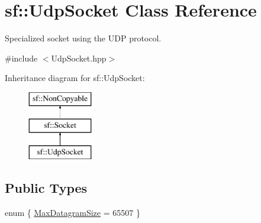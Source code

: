 \hypertarget{classsf_1_1UdpSocket}{\section{sf\-:\-:Udp\-Socket Class Reference}
\label{classsf_1_1UdpSocket}
}


Specialized socket using the U\-D\-P protocol.  




{\ttfamily \#include $<$Udp\-Socket.\-hpp$>$}

Inheritance diagram for sf\-:\-:Udp\-Socket\-:\begin{figure}[H]
\begin{center}
\leavevmode
\includegraphics[height=3.000000cm]{classsf_1_1UdpSocket}
\end{center}
\end{figure}
\subsection*{Public Types}
\begin{DoxyCompactItemize}
\item 
enum \{ \hyperlink{classsf_1_1UdpSocket_a14c7b7816e33ed1ef1f2fdb2404c06b5a728a7d33027bee0d65f70f964dd9c9eb}{Max\-Datagram\-Size} = 65507
 \}
\end{DoxyCompactItemize}
